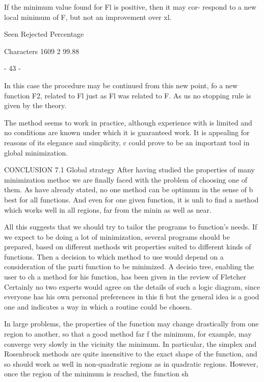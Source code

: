      If the minimum value found for Fl is positive, then it may cor-
respond to a new local minimum of F, but not an improvement over xl.
 
                 Seen Rejected  Percentage
 
Characters       1609        2   99.88
 
                               - 43 -
 
 
In this case the procedure may be continued from this new point, fo
a new function F2, related to Fl just as Fl was related to F.  As us
no stopping rule is given by the theory.
 
     The method seems to work in practice, although experience with
is limited and no conditions are known under which it is guaranteed
work.  It is appealing for reasons of its elegance and simplicity, c
could prove to be an important tool in global minimization.
 
 
 
CONCLUSION
7.1  Global strategy
     After having studied the properties of many minimization methoc
we are finally faced with the problem of choosing one of them.  As
have already stated, no one method can be optimum in the sense of b
best for all functions.  And even for one given function, it is unli
to find a method which works well in all regions, far from the minin
as well as near.
 
     All this suggests that we should try to tailor the programs to
function's needs.  If we expect to be doing a lot of minimization,
several programs should be prepared, based on different methods wit
properties suited to different kinds of functions.  Then a decision
to which method to use would depend on a consideration of the parti
function to be minimized.  A decisio tree, enabling the user to ch
a method for his function, has been given in the review of Fletcher
Certainly no two experts would agree on the details of such a logic
diagram, since everyone has his own personal preferences in this fi
but the general idea is a good one and indicates a way in which a
routine could be chosen.
 
     In large problems, the properties of the function may change
drastically from one region to another, so that a good method far f
the minimum, for example, may converge very slowly in the vicinity
the minimum.  In particular, the simplex and Rosenbrock methods are
quite insensitive to the exact shape of the function, and so should
work as well in non-quadratic regions as in quadratic regions.
However, once the region of the minimum is reached, the function sh
 
